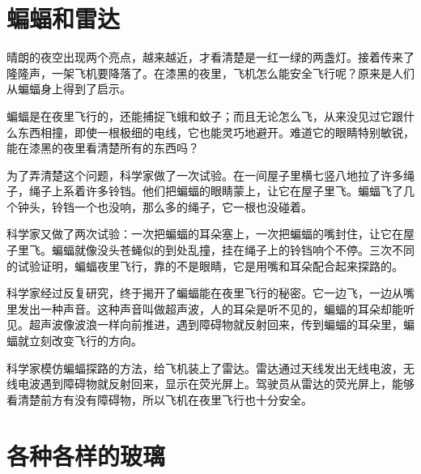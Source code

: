 \documentclass[12pt,UTF-8,openany]{ctexbook}
\begin{document}
\chapter{蝙蝠和雷达}

\begin{Large}
    
    晴朗的夜空出现两个亮点，越来越近，才看清楚是一红一绿的两盏灯。接着传来了隆隆声，一架飞机要降落了。在漆黑的夜里，飞机怎么能安全飞行呢？原来是人们从蝙蝠身上得到了启示。
    
    蝙蝠是在夜里飞行的，还能捕捉飞蛾和蚊子；而且无论怎么飞，从来没见过它跟什么东西相撞，即使一根极细的电线，它也能灵巧地避开。难道它的眼睛特别敏锐，能在漆黑的夜里看清楚所有的东西吗？
    
    为了弄清楚这个问题，科学家做了一次试验。在一间屋子里横七竖八地拉了许多绳子，绳子上系着许多铃铛。他们把蝙蝠的眼睛蒙上，让它在屋子里飞。蝙蝠飞了几个钟头，铃铛一个也没响，那么多的绳子，它一根也没碰着。
    
    科学家又做了两次试验：一次把蝙蝠的耳朵塞上，一次把蝙蝠的嘴封住，让它在屋子里飞。蝙蝠就像没头苍蝇似的到处乱撞，挂在绳子上的铃铛响个不停。三次不同的试验证明，蝙蝠夜里飞行，靠的不是眼睛，它是用嘴和耳朵配合起来探路的。
    
    科学家经过反复研究，终于揭开了蝙蝠能在夜里飞行的秘密。它一边飞，一边从嘴里发出一种声音。这种声音叫做超声波，人的耳朵是听不见的，蝙蝠的耳朵却能听见。超声波像波浪一样向前推进，遇到障碍物就反射回来，传到蝙蝠的耳朵里，蝙蝠就立刻改变飞行的方向。
    
    科学家模仿蝙蝠探路的方法，给飞机装上了雷达。雷达通过天线发出无线电波，无线电波遇到障碍物就反射回来，显示在荧光屏上。驾驶员从雷达的荧光屏上，能够看清楚前方有没有障碍物，所以飞机在夜里飞行也十分安全。
    
\end{Large}

\chapter{各种各样的玻璃}
\end{document}
